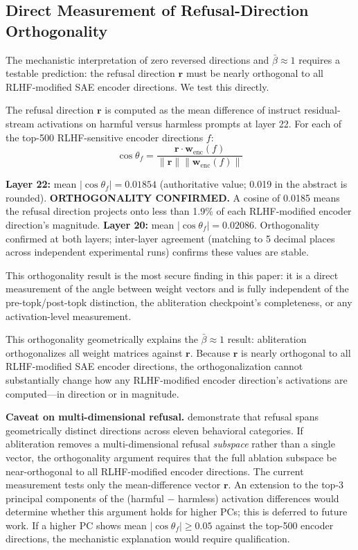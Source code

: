 \documentclass[11pt,letterpaper]{article}
\begin{document}
\subsection{Direct Measurement of Refusal-Direction Orthogonality}
\label{sec:orthogonality}

The mechanistic interpretation of zero reversed directions and $\bar{\beta} \approx 1$ requires a
testable prediction: the refusal direction $\mathbf{r}$ must be nearly orthogonal to all
RLHF-modified SAE encoder directions. We test this directly.

The refusal direction $\mathbf{r}$ is computed as the mean difference of instruct residual-stream
activations on harmful versus harmless prompts at layer 22. For each of the top-500 RLHF-sensitive
encoder directions $f$:
\begin{equation}
  \cos\theta_f = \frac{\mathbf{r} \cdot \mathbf{w}_{\text{enc}}(f)}
                      {\|\mathbf{r}\| \|\mathbf{w}_{\text{enc}}(f)\|}
\end{equation}

\noindent\textbf{Layer 22:} mean $|\cos\theta_f| = 0.01854$ (authoritative value; 0.019 in the
abstract is rounded). \textbf{ORTHOGONALITY CONFIRMED.} A cosine of 0.0185 means the refusal
direction projects onto less than 1.9\% of each RLHF-modified encoder direction's magnitude.
\textbf{Layer 20:} mean $|\cos\theta_f| = 0.02086$. Orthogonality confirmed at both layers;
inter-layer agreement (matching to 5 decimal places across independent experimental runs) confirms
these values are stable.

This orthogonality result is the most secure finding in this paper: it is a direct measurement of the
angle between weight vectors and is fully independent of the pre-topk/post-topk distinction, the
abliteration checkpoint's completeness, or any activation-level measurement.

This orthogonality geometrically explains the $\bar{\beta} \approx 1$ result: abliteration
orthogonalizes all weight matrices against $\mathbf{r}$. Because $\mathbf{r}$ is nearly orthogonal
to all RLHF-modified SAE encoder directions, the orthogonalization cannot substantially change how
any RLHF-modified encoder direction's activations are computed---in direction or in magnitude.

\noindent\textbf{Caveat on multi-dimensional refusal.} \citet{Joad2026} demonstrate that refusal
spans geometrically distinct directions across eleven behavioral categories. If abliteration removes
a multi-dimensional refusal \emph{subspace} rather than a single vector, the orthogonality argument
requires that the full ablation subspace be near-orthogonal to all RLHF-modified encoder directions.
The current measurement tests only the mean-difference vector $\mathbf{r}$. An extension to the top-3
principal components of the (harmful $-$ harmless) activation differences would determine whether
this argument holds for higher PCs; this is deferred to future work. If a higher PC shows mean
$|\cos\theta_f| \geq 0.05$ against the top-500 encoder directions, the mechanistic explanation would
require qualification.
\end{document}
